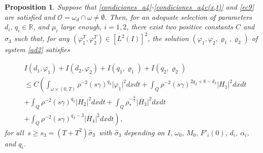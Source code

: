 \documentclass[11pt,a4paper]{amsart}
\numberwithin{equation}{section}
\newtheorem{proposition}{Proposition}[section]
\begin{document}
\begin{proposition}\label{first_carlmeanpropo111}
    Suppose that  \eqref{condiciones_a4}-\eqref{condiciones_a4c(x,t)} and  \eqref{ec9} are satisfied    and $\mathcal{O} =\omega_d\cap \omega \neq \emptyset$. Then, for an adequate selection of parameters $d_i,\, q_i \in \mathbb{R}$,  and $\mu_i$  large enough, $i=1,2$, there exist two positive constants $C$ and $\hat{\sigma}_3$ such that, for any  $(\varphi_1^T,\varphi_2^T)\in [L^2(I)]^2$, the solution $(\varphi_{1},\varphi_{2},\varrho_{1},\varrho_{2})$  of  system \eqref{ad2} satisfies
    
\begin{equation}\label{carleman2}
    \begin{split}
         	& I(d_1,\varphi_1) + I(d_2,\varphi_2) +I(q_1,\varrho_1) + I(q_2,\varrho_2)\\
         	&	 \leq C\left(\int_{\omega\times (0,T)}\rho^{-2}(s\gamma)^{q_3}\vert \varphi_1 \vert^2dxdt +\int_{Q}\rho^{-2}(s\gamma)^{2q_{2}+8-d_{2}}\vert H_1\vert^2dxdt \right.\\
         	&	  + \int_{Q}\rho^{-2}(s\gamma)^{q_2}\vert H_2\vert^2dxdt+ \int_{Q}\rho^{-\frac{8}{5}}_{*} \vert \overline{H}_3\vert^2  dxdt\\
         	& \left.  +\int_{Q}\rho^{-2}(s\gamma)^{q_2-3} \vert \overline{H}_4\vert^2  dxdt \right),
    \end{split}    
    \end{equation}
    for all  $ \,s\geq s_3 = (T+T^2)\hat{\sigma}_3$\,  with $\hat{\sigma}_{3}$ depending on  $I,\, \omega_{0},\, M_{0},\,  F'_i(0),\,  d_{i}$, $\alpha_{i}$,  and $q_{i}$.
\end{proposition}
\end{document}
